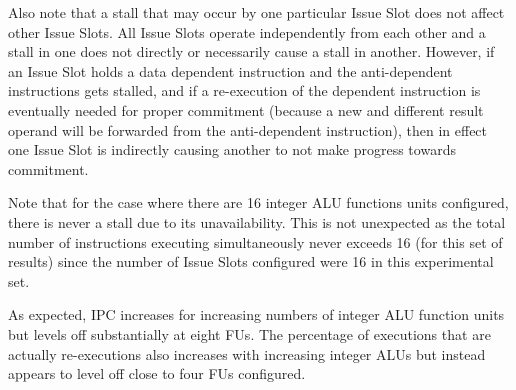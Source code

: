 \documentclass[10pt,dvips]{article}
\begin{document}
Also note that a stall that may occur by one particular Issue Slot
does not affect other Issue Slots.  All Issue Slots operate
independently from each other and a stall in one does not
directly or necessarily cause a stall in another.
However, if an Issue Slot holds a data dependent instruction
and the anti-dependent instructions gets stalled, and if
a re-execution of the dependent instruction is eventually
needed for proper commitment (because a new and different 
result operand
will be forwarded from the anti-dependent instruction), 
then in effect one Issue Slot
is indirectly causing another to not make progress towards commitment.

Note that for the case where there are 16 integer ALU functions
units configured, there is never a stall due to its unavailability.
This is not unexpected as the total number of instructions executing
simultaneously never exceeds 16 (for this set of results) since
the number of Issue Slots configured were 16 in this experimental set.

As expected, IPC increases for increasing numbers of integer
ALU function units but levels off substantially at eight FUs.
The percentage of executions that are actually re-executions
also increases with increasing integer ALUs but instead appears
to level off close to four FUs configured.
\end{document}
